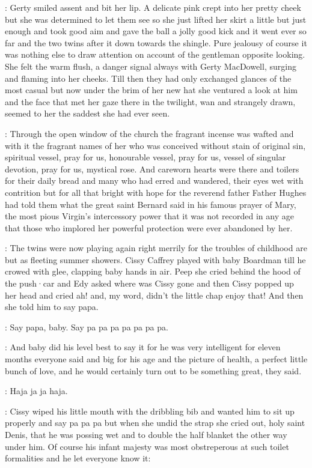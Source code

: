 :
Gerty smiled assent and bit her lip.
A delicate pink
crept into her pretty cheek
but she was determined to let them see
so she just lifted her skirt
a little but just enough
and took good aim
and gave the ball a jolly good kick
and it went ever so far
and the two twins after it
down towards the shingle.
Pure jealousy
of course
it was nothing else
to draw attention
on account of the gentleman opposite
looking.
She felt the warm flush,
a danger signal always with Gerty MacDowell,
surging and flaming into her cheeks.
Till then
they had only exchanged glances
of the most casual
but now
under the brim of her new hat
she ventured a look at him
and the face that met her gaze
there in the twilight,
wan and strangely drawn,
seemed to her
the saddest
she had ever seen.

:
Through the open window of the church
the fragrant incense was wafted
and with it
the fragrant names of her
who was conceived without stain of original sin,
spiritual vessel,
pray for us,
honourable vessel,
pray for us,
vessel of singular devotion,
pray for us,
mystical rose.
And careworn hearts were there
and toilers for their daily bread
and many who had erred and wandered,
their eyes wet with contrition
but for all that
bright with hope
for the reverend father Father Hughes
had told them
what the great saint Bernard said
in his famous prayer of Mary,
the most pious Virgin's intercessory power
that it was not recorded in any age
that those who implored her powerful protection
were ever abandoned by her.

:
The twins were now playing again
right merrily
for the troubles of childhood
are but as fleeting summer showers.
Cissy Caffrey played with baby Boardman
till he crowed with glee,
clapping baby hands in air.
Peep she cried
behind the hood of the push·car
and Edy asked where was Cissy gone
and then Cissy popped up her head
and cried ah!
and,
my word,
didn't the little chap enjoy that!
And then she told him
to say papa.

\cissy:
Say papa,
baby.
Say pa pa pa pa pa pa pa.

:
And baby did his level best to say it
for he was very intelligent for eleven months
everyone said
and big for his age
and the picture of health,
a perfect little bunch of love,
and he would certainly turn out
to be something great,
they said.

\baby:
Haja ja ja haja.

:
Cissy wiped his little mouth
with the dribbling bib
and wanted him to sit up properly
and say pa pa pa
but when she undid the strap
she cried out,
holy saint Denis,
that he was possing wet
and to double the half blanket the other way under him.
Of course
his infant majesty was most obstreperous
at such toilet formalities
and he let everyone know it:

